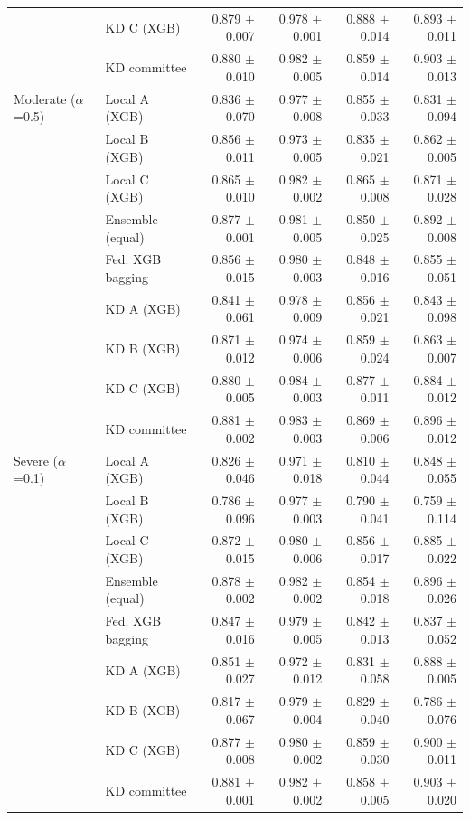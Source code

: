 \begin{table}[t]
\begin{tabular}{llrrrr}
 & KD C (XGB) & 0.879 $\pm$ 0.007 & 0.978 $\pm$ 0.001 & 0.888 $\pm$ 0.014 & 0.893 $\pm$ 0.011 \\
 & KD committee & 0.880 $\pm$ 0.010 & 0.982 $\pm$ 0.005 & 0.859 $\pm$ 0.014 & 0.903 $\pm$ 0.013 \\
\midrule
Moderate ($\alpha$=0.5) & Local A (XGB) & 0.836 $\pm$ 0.070 & 0.977 $\pm$ 0.008 & 0.855 $\pm$ 0.033 & 0.831 $\pm$ 0.094 \\
 & Local B (XGB) & 0.856 $\pm$ 0.011 & 0.973 $\pm$ 0.005 & 0.835 $\pm$ 0.021 & 0.862 $\pm$ 0.005 \\
 & Local C (XGB) & 0.865 $\pm$ 0.010 & 0.982 $\pm$ 0.002 & 0.865 $\pm$ 0.008 & 0.871 $\pm$ 0.028 \\
 & Ensemble (equal) & 0.877 $\pm$ 0.001 & 0.981 $\pm$ 0.005 & 0.850 $\pm$ 0.025 & 0.892 $\pm$ 0.008 \\
 & Fed. XGB bagging & 0.856 $\pm$ 0.015 & 0.980 $\pm$ 0.003 & 0.848 $\pm$ 0.016 & 0.855 $\pm$ 0.051 \\
 & KD A (XGB) & 0.841 $\pm$ 0.061 & 0.978 $\pm$ 0.009 & 0.856 $\pm$ 0.021 & 0.843 $\pm$ 0.098 \\
 & KD B (XGB) & 0.871 $\pm$ 0.012 & 0.974 $\pm$ 0.006 & 0.859 $\pm$ 0.024 & 0.863 $\pm$ 0.007 \\
 & KD C (XGB) & 0.880 $\pm$ 0.005 & 0.984 $\pm$ 0.003 & 0.877 $\pm$ 0.011 & 0.884 $\pm$ 0.012 \\
 & KD committee & 0.881 $\pm$ 0.002 & 0.983 $\pm$ 0.003 & 0.869 $\pm$ 0.006 & 0.896 $\pm$ 0.012 \\
\midrule
Severe ($\alpha$=0.1) & Local A (XGB) & 0.826 $\pm$ 0.046 & 0.971 $\pm$ 0.018 & 0.810 $\pm$ 0.044 & 0.848 $\pm$ 0.055 \\
 & Local B (XGB) & 0.786 $\pm$ 0.096 & 0.977 $\pm$ 0.003 & 0.790 $\pm$ 0.041 & 0.759 $\pm$ 0.114 \\
 & Local C (XGB) & 0.872 $\pm$ 0.015 & 0.980 $\pm$ 0.006 & 0.856 $\pm$ 0.017 & 0.885 $\pm$ 0.022 \\
 & Ensemble (equal) & 0.878 $\pm$ 0.002 & 0.982 $\pm$ 0.002 & 0.854 $\pm$ 0.018 & 0.896 $\pm$ 0.026 \\
 & Fed. XGB bagging & 0.847 $\pm$ 0.016 & 0.979 $\pm$ 0.005 & 0.842 $\pm$ 0.013 & 0.837 $\pm$ 0.052 \\
 & KD A (XGB) & 0.851 $\pm$ 0.027 & 0.972 $\pm$ 0.012 & 0.831 $\pm$ 0.058 & 0.888 $\pm$ 0.005 \\
 & KD B (XGB) & 0.817 $\pm$ 0.067 & 0.979 $\pm$ 0.004 & 0.829 $\pm$ 0.040 & 0.786 $\pm$ 0.076 \\
 & KD C (XGB) & 0.877 $\pm$ 0.008 & 0.980 $\pm$ 0.002 & 0.859 $\pm$ 0.030 & 0.900 $\pm$ 0.011 \\
 & KD committee & 0.881 $\pm$ 0.001 & 0.982 $\pm$ 0.002 & 0.858 $\pm$ 0.005 & 0.903 $\pm$ 0.020 \\
\bottomrule
\end{tabular}
\end{table}
